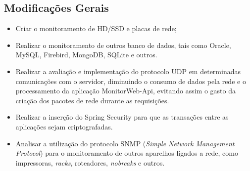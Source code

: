 \subsection{Modificações Gerais}\label{subsec:mista}
    \begin{itemize}
        \item Criar o monitoramento de HD/SSD e placas de rede;
        
        \item Realizar o monitoramento de outros banco de dados, tais como Oracle, MySQL, Firebird, MongoDB, SQLite e outros.
        
        \item Realizar a avaliação e implementação do protocolo UDP em determinadas comunicações com o servidor, diminuindo o consumo de dados pela rede e o processamento da aplicação MonitorWeb-Api, evitando assim o gasto da criação dos pacotes de rede durante as requisições.
        
        \item Realizar a inserção do Spring Security para que as transações entre as aplicações sejam criptografadas.
        
        \item Analisar a utilização do protocolo SNMP (\textit{Simple Network Management Protocol}) para o monitoramento de outros aparelhos ligados a rede, como impressoras, \textit{racks}, roteadores, \textit{nobreaks} e outros.
    \end{itemize}